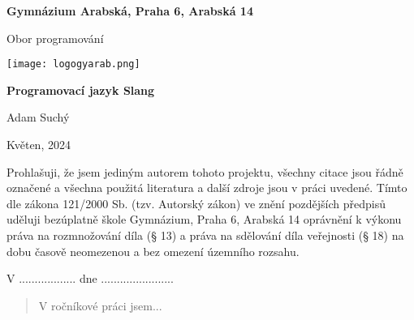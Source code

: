 
\begin{titlepage}
\begin{center}
\large \vspace*{\fill}
\thispagestyle{empty}

\LARGE

{ \huge \textbf{Gymnázium Arabská, Praha 6, Arabská 14}}

{\LARGE Obor programování }

\vfill
\texttt{[image: logogyarab.png]}
\vspace{15pt}

\vfill

{\huge \textbf{Programovací jazyk Slang}}

\vfill

Adam Suchý

\vfill

{\large Květen, 2024}

\vspace*{\fill}
\end{center}
\end{titlepage}

\thispagestyle{empty}
\addtocounter{page}{-1}
\vspace*{\fill}
Prohlašuji, že jsem jediným autorem tohoto projektu, všechny citace jsou řádně označené a všechna 
použitá literatura a další zdroje jsou v práci uvedené. Tímto dle zákona 121/2000 Sb. (tzv. Autorský zákon) 
ve znění pozdějších předpisů uděluji bezúplatně škole Gymnázium, Praha 6, Arabská 14 oprávnění k výkonu 
práva na rozmnožování díla (§ 13) a práva na sdělování díla veřejnosti (§ 18) na dobu časově neomezenou a 
bez omezení územního rozsahu.

\vspace{2cm}
V .................. dne .......................


\vspace{2cm}

\newpage
\begin{abstract}
    V ročníkové práci jsem...
\end{abstract}

\tableofcontents
